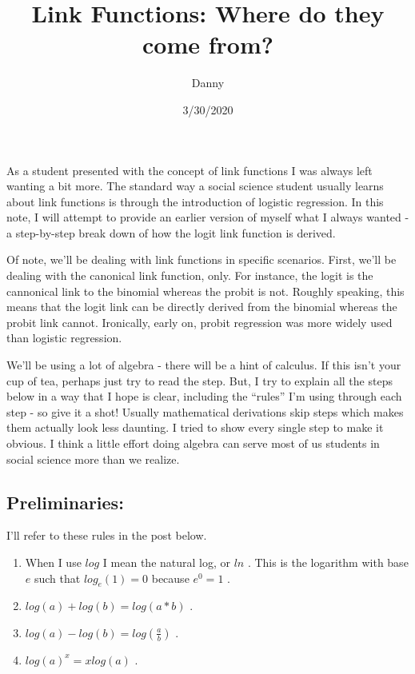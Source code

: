 \documentclass[
]{article}
\title{Link Functions: Where do they come from?}
\author{Danny}
\date{3/30/2020}
\providecommand{\tightlist}{%
  \setlength{\itemsep}{0pt}\setlength{\parskip}{0pt}}
\begin{document}
\maketitle

As a student presented with the concept of link functions I was always
left wanting a bit more. The standard way a social science student
usually learns about link functions is through the introduction of
logistic regression. In this note, I will attempt to provide an earlier
version of myself what I always wanted - a step-by-step break down of
how the logit link function is derived.

Of note, we'll be dealing with link functions in specific scenarios.
First, we'll be dealing with the canonical link function, only. For
instance, the logit is the cannonical link to the binomial whereas the
probit is not. Roughly speaking, this means that the logit link can be
directly derived from the binomial whereas the probit link cannot.
Ironically, early on, probit regression was more widely used than
logistic regression.

We'll be using a lot of algebra - there will be a hint of calculus. If
this isn't your cup of tea, perhaps just try to read the step. But, I
try to explain all the steps below in a way that I hope is clear,
including the ``rules'' I'm using through each step - so give it a shot!
Usually mathematical derivations skip steps which makes them actually
look less daunting. I tried to show every single step to make it
obvious. I think a little effort doing algebra can serve most of us
students in social science more than we realize.

\hypertarget{preliminaries}{%
\subsection{Preliminaries:}\label{preliminaries}}

I'll refer to these rules in the post below.

\begin{enumerate}
\def\labelenumi{\arabic{enumi}.}
\tightlist
\item
  When I use \(log\) I mean the natural log, or \(ln\) . This is the
  logarithm with base \(e\) such that \(log_e(1) = 0\) because
  \(e^0 =1\) .
\item
  \(log(a) + log(b) = log(a*b)\) .
\item
  \(log(a)-log(b) = log(\frac{a}{b})\) .
\item
  \(log(a)^x = xlog(a)\) .
\end{enumerate}
\end{document}

